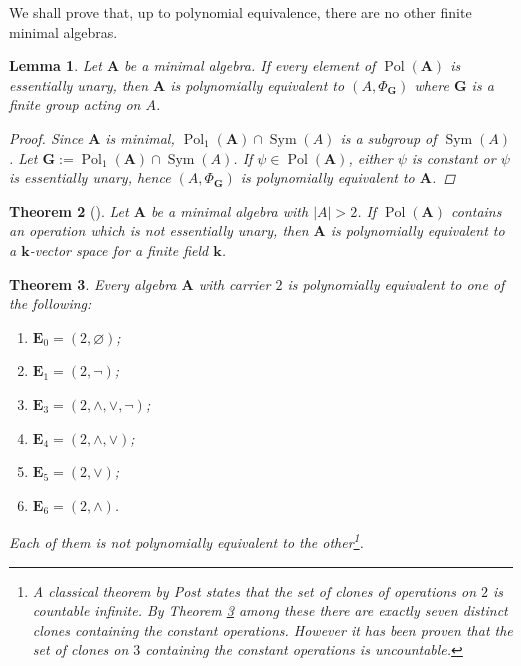 \documentclass{amsart}
\theoremstyle{plain}
\newtheorem{theorem}{Theorem}[section]
\newtheorem{lemma}[theorem]{Lemma}
\theoremstyle{definition}
\theoremstyle{remark}
\DeclareMathOperator{\Pol}{Pol}
\DeclareMathOperator{\Sym}{Sym}
\begin{document}
We shall prove that, up to polynomial equivalence, there are no other finite minimal algebras. 

\begin{lemma}
    Let $\mathbf{A}$ be a minimal algebra.
    If every element of $\Pol(\mathbf{A})$ is essentially unary, then $\mathbf{A}$ is polynomially equivalent to $(A, \Phi_{\mathbf{G}})$ where $\mathbf{G}$ is a finite group acting on $A$. 
    \begin{proof}
        Since $\mathbf{A}$ is minimal, $\Pol_1(\mathbf{A}) \cap \Sym(A)$ is a subgroup of $\Sym(A)$. 
        Let $\mathbf{G}:=\Pol_1(\mathbf{A}) \cap \Sym(A)$. 
        If $\psi \in \Pol(\mathbf{A})$, either $\psi$ is constant or $\psi$ is essentially unary, hence $(A, \Phi_{\mathbf{G}})$ is polynomially equivalent to $\mathbf{A}$. 
    \end{proof}
\end{lemma}

\begin{theorem}
    [\cite{classification-minimal}]
    Let $\mathbf{A}$ be a minimal algebra with $|A| > 2$.  
    If $\Pol(\mathbf{A})$ contains an operation which is not essentially unary, then $\mathbf{A}$ is polynomially equivalent to a $\mathbf{k}$-vector space for a finite field $\mathbf{k}$. 
\end{theorem}

\begin{theorem}
    \label{classification-two}
    Every algebra $\mathbf{A}$ with carrier $2$ is polynomially equivalent to one of the following: 
    \begin{enumerate}
        \item $\mathbf{E}_0= (2, \varnothing)$;
        \item $\mathbf{E}_1 = (2, \lnot)$; 
        \item $\mathbf{E}_3 = (2, \land, \lor, \lnot)$; 
        \item $\mathbf{E}_4 = (2, \land, \lor)$; 
        \item $\mathbf{E}_5 = (2, \lor)$; 
        \item $\mathbf{E}_6 = (2, \land)$.
    \end{enumerate}
    Each of them is not polynomially equivalent to the other\footnote{A classical theorem by Post states that the set of clones of operations on $2$ is countable infinite. 
    By Theorem \ref{classification-two} among these there are exactly seven distinct clones containing the constant operations.
    However it has been proven that the set of clones on $3$ containing the constant operations is uncountable.}.
\end{theorem}
\end{document}
